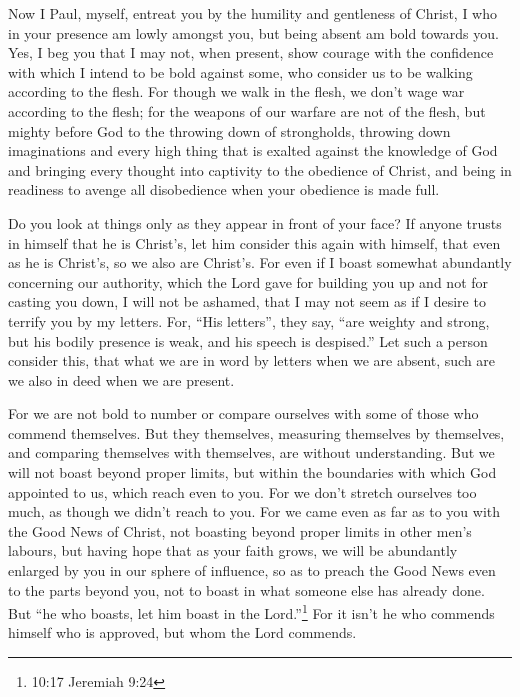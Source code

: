  Now I Paul, myself, entreat you by the humility and
gentleness of Christ, I who in your presence am lowly amongst you, but
being absent am bold towards you.  Yes, I beg you that I may
not, when present, show courage with the confidence with which I intend
to be bold against some, who consider us to be walking according to the
flesh.  For though we walk in the flesh, we don't wage war
according to the flesh;  for the weapons of our warfare are
not of the flesh, but mighty before God to the throwing down of
strongholds,  throwing down imaginations and every high
thing that is exalted against the knowledge of God and bringing every
thought into captivity to the obedience of Christ,  and
being in readiness to avenge all disobedience when your obedience is
made full.

 Do you look at things only as they appear in front of your
face? If anyone trusts in himself that he is Christ's, let him consider
this again with himself, that even as he is Christ's, so we also are
Christ's.  For even if I boast somewhat abundantly
concerning our authority, which the Lord gave for building you up and
not for casting you down, I will not be ashamed,  that I may
not seem as if I desire to terrify you by my letters.  For,
``His letters'', they say, ``are weighty and strong, but his bodily
presence is weak, and his speech is despised.''  Let such a
person consider this, that what we are in word by letters when we are
absent, such are we also in deed when we are present.

 For we are not bold to number or compare ourselves with
some of those who commend themselves. But they themselves, measuring
themselves by themselves, and comparing themselves with themselves, are
without understanding.  But we will not boast beyond proper
limits, but within the boundaries with which God appointed to us, which
reach even to you.  For we don't stretch ourselves too
much, as though we didn't reach to you. For we came even as far as to
you with the Good News of Christ,  not boasting beyond
proper limits in other men's labours, but having hope that as your faith
grows, we will be abundantly enlarged by you in our sphere of influence,
 so as to preach the Good News even to the parts beyond
you, not to boast in what someone else has already done. 
But ``he who boasts, let him boast in the Lord.''\footnote{10:17
  Jeremiah 9:24}  For it isn't he who commends himself who
is approved, but whom the Lord commends.


